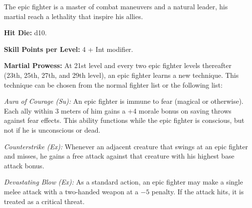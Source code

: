 The epic fighter is a master of combat maneuvers and a natural leader, his martial reach a lethality that inspire his allies.



\textbf{Hit Die:} d10.

\textbf{Skill Points per Level:} 4 + Int modifier.

\textbf{Martial Prowess:} At 21st level and every two epic fighter levels thereafter (23th, 25th, 27th, and 29th level), an epic fighter learns a new technique. This technique can be chosen from the normal fighter list or the following list:

\textit{Aura of Courage (Su):} An epic fighter is immune to fear (magical or otherwise). Each ally within 3 meters of him gains a +4 morale bonus on saving throws against fear effects. This ability functions while the epic fighter is conscious, but not if he is unconscious or dead.

\textit{Counterstrike (Ex):} Whenever an adjacent creature that swings at an epic fighter and misses, he gains a free attack against that creature with his highest base attack bonus.

\textit{Devastating Blow (Ex):} As a standard action, an epic fighter may make a single melee attack with a two-handed weapon at a $-5$ penalty. If the attack hits, it is treated as a critical threat.

